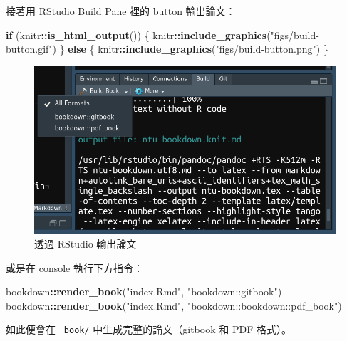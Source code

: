 \documentclass[oneside]{book}
\newenvironment{Shaded}{\begin{snugshade}}{\end{snugshade}}
\newcommand{\KeywordTok}[1]{\textcolor[rgb]{0.13,0.29,0.53}{\textbf{#1}}}
\newcommand{\StringTok}[1]{\textcolor[rgb]{0.31,0.60,0.02}{#1}}
\newcommand{\ControlFlowTok}[1]{\textcolor[rgb]{0.13,0.29,0.53}{\textbf{#1}}}
\newcommand{\OperatorTok}[1]{\textcolor[rgb]{0.81,0.36,0.00}{\textbf{#1}}}
\newcommand{\NormalTok}[1]{#1}
\theoremstyle{definition}
\theoremstyle{definition}
\theoremstyle{definition}
\theoremstyle{remark}
\begin{document}
接著用 RStudio Build Pane 裡的 button 輸出論文：

\begin{Shaded}
\begin{Highlighting}[]
\ControlFlowTok{if}\NormalTok{ (knitr}\OperatorTok{::}\KeywordTok{is_html_output}\NormalTok{()) \{}
\NormalTok{  knitr}\OperatorTok{::}\KeywordTok{include_graphics}\NormalTok{(}\StringTok{"figs/build-button.gif"}\NormalTok{)}
\NormalTok{\} }\ControlFlowTok{else}\NormalTok{ \{}
\NormalTok{  knitr}\OperatorTok{::}\KeywordTok{include_graphics}\NormalTok{(}\StringTok{"figs/build-button.png"}\NormalTok{)}
\NormalTok{\}}
\end{Highlighting}
\end{Shaded}

\begin{figure}[H]

{\centering \includegraphics[width=1\linewidth]{figs/build-button} 

}

\caption{透過 RStudio 輸出論文}\label{fig:unnamed-chunk-3}
\end{figure}

或是在 console 執行下方指令：

\begin{Shaded}
\begin{Highlighting}[]
\NormalTok{bookdown}\OperatorTok{::}\KeywordTok{render_book}\NormalTok{(}\StringTok{"index.Rmd"}\NormalTok{, }\StringTok{"bookdown::gitbook"}\NormalTok{)}
\NormalTok{bookdown}\OperatorTok{::}\KeywordTok{render_book}\NormalTok{(}\StringTok{"index.Rmd"}\NormalTok{, }\StringTok{"bookdown::bookdown::pdf_book"}\NormalTok{)}
\end{Highlighting}
\end{Shaded}

如此便會在 \texttt{\_book/} 中生成完整的論文（gitbook 和 PDF 格式）。
\end{document}

